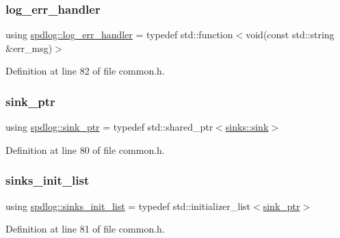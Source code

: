 \subsubsection{\texorpdfstring{log\+\_\+err\+\_\+handler}{log\_err\_handler}}
{\footnotesize\ttfamily using \hyperlink{namespacespdlog_ad3ed787a29f245c833ef66faf48036e2}{spdlog\+::log\+\_\+err\+\_\+handler} = typedef std\+::function$<$void(const std\+::string \&err\+\_\+msg)$>$}



Definition at line 82 of file common.\+h.

\mbox{\label{namespacespdlog_a422c57d3088160b517e5a74e5f318253}} 
\subsubsection{\texorpdfstring{sink\+\_\+ptr}{sink\_ptr}}
{\footnotesize\ttfamily using \hyperlink{namespacespdlog_a422c57d3088160b517e5a74e5f318253}{spdlog\+::sink\+\_\+ptr} = typedef std\+::shared\+\_\+ptr$<$\hyperlink{classspdlog_1_1sinks_1_1sink}{sinks\+::sink}$>$}



Definition at line 80 of file common.\+h.

\mbox{\label{namespacespdlog_aa9b5c2298bf713fbe02b7e538d797ecd}} 
\subsubsection{\texorpdfstring{sinks\+\_\+init\+\_\+list}{sinks\_init\_list}}
{\footnotesize\ttfamily using \hyperlink{namespacespdlog_aa9b5c2298bf713fbe02b7e538d797ecd}{spdlog\+::sinks\+\_\+init\+\_\+list} = typedef std\+::initializer\+\_\+list$<$\hyperlink{namespacespdlog_a422c57d3088160b517e5a74e5f318253}{sink\+\_\+ptr}$>$}



Definition at line 81 of file common.\+h.

\mbox{\label{namespacespdlog_af48e310b2f366ac6544701e6a3b56247}} 
